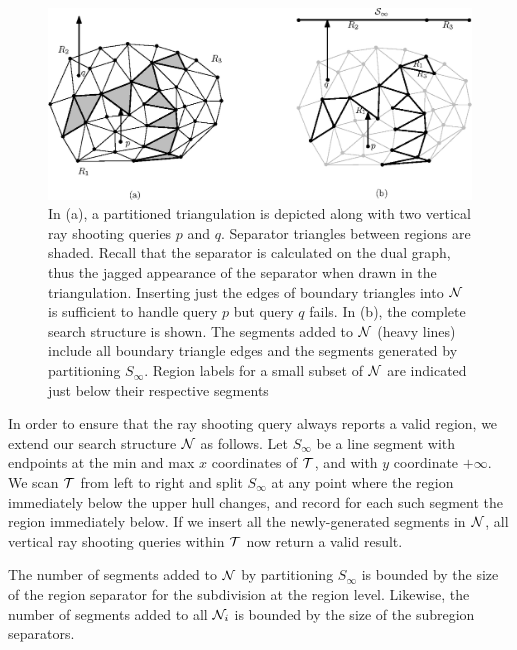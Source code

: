 \begin{figure}
  \includegraphics[width=\textwidth]{Fig5}
  \caption[Point location by vertical ray shooting]{In (a), a 
    partitioned triangulation is depicted along with two vertical
    ray shooting queries $p$ and $q$.
    Separator triangles between regions are shaded.
    Recall that the separator is calculated on the dual graph, thus
    the jagged appearance of the separator when drawn in the 
    triangulation.
    Inserting just the edges of boundary triangles into $\mathcal{N}$ is 
    sufficient to handle query $p$ but query $q$ fails.
    In (b), the complete search structure is shown.
    The segments added to $\mathcal{N}$ (heavy lines) 
    include all boundary triangle edges and the segments generated
    by partitioning $S_{\infty}$.
    Region labels for a small subset of $\mathcal{N}$ are indicated just below
    their respective segments
  }
  \label{fig:pl_structure}
\end{figure}
              
In order to ensure that the ray shooting query always reports a valid region, we 
extend our search structure $\mathcal{N}$ as follows.
Let $S_{\infty}$ be a line segment with endpoints at the min and max 
$x$ coordinates of $\mathcal{T}$, and with $y$ coordinate $+\infty$.
We scan $\mathcal{T}$ from left to right and split $S_{\infty}$ at any
point where the region immediately below the upper hull changes,
and record for each such segment the region immediately below.
If we insert all the newly-generated segments in $\mathcal{N}$, all vertical ray 
shooting queries within $\mathcal{T}$ now return a valid result.

\begin{lemma}\label{lem:size_s_infty}
The number of segments added to $\mathcal{N}$ by partitioning $S_{\infty}$
is bounded by the size of the region separator for the subdivision
at the region level. Likewise, the number of segments added 
to all $\mathcal{N}_i$ is bounded by the size of the subregion separators.
\end{lemma}

